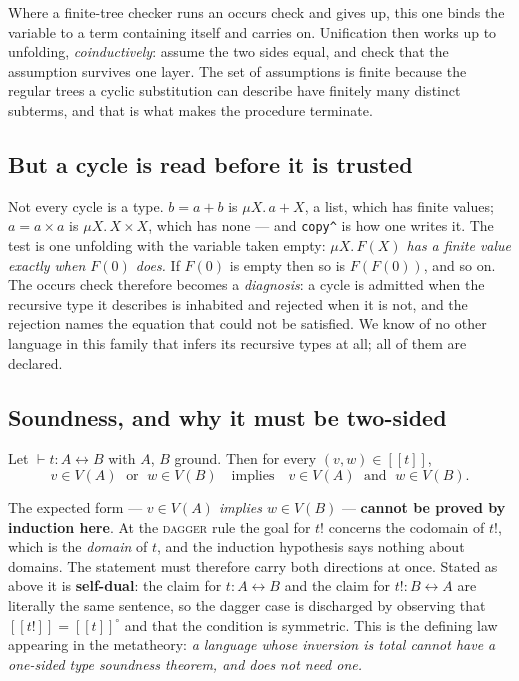 \documentclass[runningheads,envcountsame]{llncs}
\newcommand{\den}[1]{\ensuremath{[\![#1]\!]}}
\newcommand{\iso}{\leftrightarrow}
\newcommand{\conv}{^{\circ}}
\begin{document}
Where a finite-tree checker runs an occurs check and gives up, this one binds the
variable to a term containing itself and carries on. Unification then works up to
unfolding, \emph{coinductively}: assume the two sides equal, and check that the
assumption survives one layer. The set of assumptions is finite because the regular
trees a cyclic substitution can describe have finitely many distinct subterms, and
that is what makes the procedure terminate.

\subsection{But a cycle is read before it is trusted}

Not every cycle is a type. $b = a + b$ is $\mu X.\,a + X$, a list, which has finite
values; $a = a \times a$ is $\mu X.\,X \times X$, which has none --- and
\texttt{copy\textasciicircum{}} is how one writes it. The test is one unfolding with the variable
taken empty: \emph{$\mu X.\,F(X)$ has a finite value exactly when $F(0)$ does.} If
$F(0)$ is empty then so is $F(F(0))$, and so on. The occurs check therefore becomes
a \emph{diagnosis}: a cycle is admitted when the recursive type it describes is
inhabited and rejected when it is not, and the rejection names the equation that
could not be satisfied. We know of no other language in this family that infers its
recursive types at all; all of them are declared.

\subsection{Soundness, and why it must be two-sided}

\begin{proposition}[Soundness]\label{prop:sound}
Let $\vdash t : A \iso B$ with $A$, $B$ ground. Then for every
$(v,w) \in \den{t}$,
\[
    v \in V(A) \;\text{ or }\; w \in V(B)
    \quad\text{implies}\quad
    v \in V(A) \;\text{ and }\; w \in V(B).
\]
\end{proposition}

The expected form --- \emph{$v \in V(A)$ implies $w \in V(B)$} --- \textbf{cannot be
proved by induction here}. At the \textsc{dagger} rule the goal for $t!$ concerns
the codomain of $t!$, which is the \emph{domain} of $t$, and the induction
hypothesis says nothing about domains. The statement must therefore carry both
directions at once. Stated as above it is \textbf{self-dual}: the claim for
$t : A \iso B$ and the claim for $t! : B \iso A$ are literally the same sentence,
so the dagger case is discharged by observing that $\den{t!} = \den{t}\conv$ and
that the condition is symmetric. This is the defining law appearing in the
metatheory: \emph{a language whose inversion is total cannot have a one-sided type
soundness theorem, and does not need one.}
\end{document}
